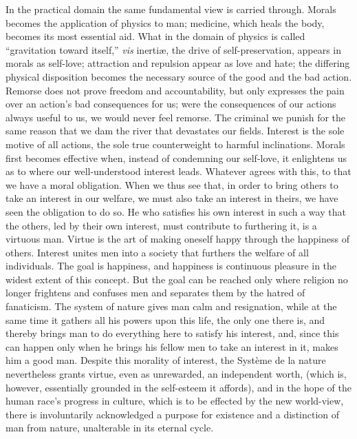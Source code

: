 In the practical domain the same fundamental view is carried through.
Morals becomes the application of physics to man; medicine, which heals
the body, becomes its most essential aid. What in the domain of physics
is called ``gravitation toward itself,'' \emph{vis} inertiæ, the drive
of self-preservation, appears in morals as self-love; attraction and
repulsion appear as love and hate; the differing physical disposition
becomes the necessary source of the good and the bad action. Remorse
does not prove freedom and accountability, but only expresses the pain
over an action's bad consequences for us; were the
consequences of our actions always useful to us, we would never feel
remorse. The criminal we punish for the same reason that we dam the
river that devastates our fields. Interest is the sole motive of all
actions, the sole true counterweight to harmful inclinations. Morals
first becomes effective when, instead of condemning our self-love, it
enlightens us as to where our well-understood interest leads. Whatever
agrees with this, to that we have a moral obligation. When we thus see
that, in order to bring others to take an interest in our welfare, we
must also take an interest in theirs, we have seen the obligation to do
so. He who satisfies his own interest in such a way that the others,
led by their own interest, must contribute to furthering it, is a
virtuous man. Virtue is the art of making oneself happy through the
happiness of others. Interest unites men into a society that furthers
the welfare of all individuals. The goal is happiness, and happiness is
continuous pleasure in the widest extent of this concept. But the goal
can be reached only where religion no longer frightens and confuses men
and separates them by the hatred of fanaticism. The system of nature
gives man calm and resignation, while at the same time it gathers all
his powers upon this life, the only one there is, and thereby brings man
to do everything here to satisfy his interest, and, since this can
happen only when he brings his fellow men to take an interest in it,
makes him a good man. Despite this morality of interest, the Système de
la nature nevertheless grants virtue, even as unrewarded, an
independent worth, (which is, however, essentially grounded in the
self-esteem it affords), and in the hope of the human race's progress in
culture, which is to be effected by the new world-view, there is
involuntarily acknowledged a purpose for existence and a distinction of
man from nature, unalterable in its eternal cycle.

\divrule

